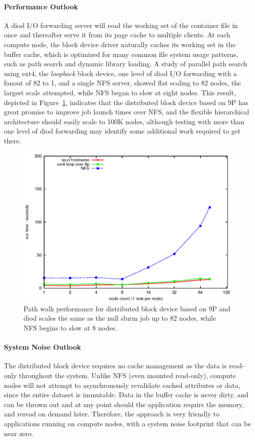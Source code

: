 \paragraph{Performance Outlook}
A diod I/O forwarding server will read the working set of the container
file in once and thereafter serve it from its page cache to multiple clients.
At each compute node,
the block device driver naturally caches its working set in the buffer cache,
which is optimized for many common file system usage patterns,
such as path search and dynamic library loading.
A study of parallel path search\cite{BlkDevPathSearch}
using ext4, the {\em loopback} block device, one level of diod I/O forwarding
with a fanout of 82 to 1, and a single NFS server,
showed flat scaling to 82 nodes, the largest scale attempted,
while NFS began to slow at eight nodes.
This result, depicted in Figure~\ref{FigPathWalk},
indicates that the distributed block device based on 9P has
great promise to improve job launch times over NFS, and the flexible
hierarchical architecture should easily scale to 100K nodes, although
testing with more than one level of diod forwarding may identify some
additional work required to get there.
\begin{figure}
\centering
\includegraphics[scale=0.60]{../fig/pathwalk.eps}
\caption{\small
Path walk performance for distributed block device based on 9P and diod
scales the same as the null slurm job up to 82 nodes, while NFS begins
to slow at 8 nodes.
}
\label{FigPathWalk}
\end{figure}

\paragraph{System Noise Outlook}
The distributed block device requires no cache management as the
data is read-only throughout the system.  Unlike NFS (even mounted read-only),
compute nodes will not attempt to asynchronously revalidate cached
attributes or data, since the entire dataset is immutable.
Data in the buffer cache is never dirty, and can be thrown out and at
any point should the application require the memory, and reread on demand later.
Therefore, the approach is very friendly to applications running on compute
nodes, with a system noise footprint that can be near zero.

